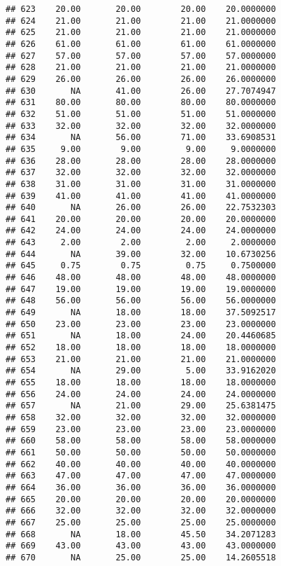 \documentclass[
]{article}
\begin{document}
\begin{verbatim}
## 623    20.00       20.00        20.00    20.0000000
## 624    21.00       21.00        21.00    21.0000000
## 625    21.00       21.00        21.00    21.0000000
## 626    61.00       61.00        61.00    61.0000000
## 627    57.00       57.00        57.00    57.0000000
## 628    21.00       21.00        21.00    21.0000000
## 629    26.00       26.00        26.00    26.0000000
## 630       NA       41.00        26.00    27.7074947
## 631    80.00       80.00        80.00    80.0000000
## 632    51.00       51.00        51.00    51.0000000
## 633    32.00       32.00        32.00    32.0000000
## 634       NA       56.00        71.00    33.6908531
## 635     9.00        9.00         9.00     9.0000000
## 636    28.00       28.00        28.00    28.0000000
## 637    32.00       32.00        32.00    32.0000000
## 638    31.00       31.00        31.00    31.0000000
## 639    41.00       41.00        41.00    41.0000000
## 640       NA       26.00        26.00    22.7532303
## 641    20.00       20.00        20.00    20.0000000
## 642    24.00       24.00        24.00    24.0000000
## 643     2.00        2.00         2.00     2.0000000
## 644       NA       39.00        32.00    10.6730256
## 645     0.75        0.75         0.75     0.7500000
## 646    48.00       48.00        48.00    48.0000000
## 647    19.00       19.00        19.00    19.0000000
## 648    56.00       56.00        56.00    56.0000000
## 649       NA       18.00        18.00    37.5092517
## 650    23.00       23.00        23.00    23.0000000
## 651       NA       18.00        24.00    20.4460685
## 652    18.00       18.00        18.00    18.0000000
## 653    21.00       21.00        21.00    21.0000000
## 654       NA       29.00         5.00    33.9162020
## 655    18.00       18.00        18.00    18.0000000
## 656    24.00       24.00        24.00    24.0000000
## 657       NA       21.00        29.00    25.6381475
## 658    32.00       32.00        32.00    32.0000000
## 659    23.00       23.00        23.00    23.0000000
## 660    58.00       58.00        58.00    58.0000000
## 661    50.00       50.00        50.00    50.0000000
## 662    40.00       40.00        40.00    40.0000000
## 663    47.00       47.00        47.00    47.0000000
## 664    36.00       36.00        36.00    36.0000000
## 665    20.00       20.00        20.00    20.0000000
## 666    32.00       32.00        32.00    32.0000000
## 667    25.00       25.00        25.00    25.0000000
## 668       NA       18.00        45.50    34.2071283
## 669    43.00       43.00        43.00    43.0000000
## 670       NA       25.00        25.00    14.2605518

\end{verbatim}
\end{document}
